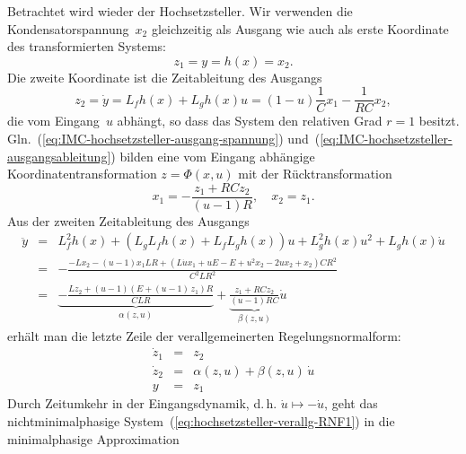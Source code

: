 \begin{example}
\label{exa:Hochsetzsteller-IMC-Spannung}Betrachtet
wird wieder der Hochsetzsteller. Wir verwenden die Kondensatorspannung~$x_{2}$
gleichzeitig als Ausgang wie auch als erste Koordinate des transformierten
Systems:
\begin{equation}
z_{1}=y=h(x)=x_{2}.\label{eq:IMC-hochsetzsteller-ausgang-spannung}
\end{equation}
Die zweite Koordinate ist die Zeitableitung des Ausgangs
\begin{equation}
z_{2}=\dot{y}=L_{f}h(x)+L_{g}h(x)u=(1-u)\frac{1}{C}x_{1}-\frac{1}{RC}x_{2},\label{eq:IMC-hochsetzsteller-ausgangsableitung}
\end{equation}
die vom Eingang~$u$ abhängt, so dass das System den relativen Grad
$r=1$ besitzt. Gln.~(\ref{eq:IMC-hochsetzsteller-ausgang-spannung})
und~(\ref{eq:IMC-hochsetzsteller-ausgangsableitung}) bilden eine
vom Eingang abhängige Koordinatentransformation $z=\Phi(x,u)$ mit
der Rücktransformation
\[
x_{1}=-\frac{z_{1}+RCz_{2}}{(u-1)R},\quad x_{2}=z_{1}.
\]
Aus der zweiten Zeitableitung des Ausgangs
\begin{eqnarray*}
\ddot{y} & = & L_{f}^{2}h(x)+\left(L_{g}L_{f}h(x)+L_{f}L_{g}h(x)\right)u+L_{g}^{2}h(x)u^{2}+L_{g}h(x)\dot{u}\\
 & = & -\frac{-Lx_{2}-\left(u-1\right)x_{1}LR+\left(L\dot{u}x_{1}+uE-E+u^{2}x_{2}-2ux_{2}+x_{2}\right)CR^{2}}{C^{2}LR^{2}}\\
 & = & \underbrace{-\frac{Lz_{2}+\left(u-1\right)\left(E+\left(u-1\right)\,z_{1}\right)R}{CLR}}_{{\displaystyle \alpha(z,u)}}+\underbrace{\frac{z_{1}+RCz_{2}}{(u-1)RC}}_{{\displaystyle \beta(z,u)}}\dot{u}
\end{eqnarray*}
erhält man die letzte Zeile der verallgemeinerten Regelungsnormalform:
\begin{equation}
\begin{array}{lcl}
\dot{z}_{1} & = & z_{2}\\
\dot{z}_{2} & = & \alpha(z,u)+\beta(z,u)\,\dot{u}\\
y & = & z_{1}
\end{array}\label{eq:hochsetzsteller-verallg-RNF1}
\end{equation}
Durch Zeitumkehr in der Eingangsdynamik, d.\,h. $\dot{u}\mapsto-\dot{u}$,
geht das nicht\-minimal\-phasige System~(\ref{eq:hochsetzsteller-verallg-RNF1})
in die minimalphasige Approximation
\begin{equation}
\begin{array}{lcl}

\end{array}
\end{equation}
\end{example}

